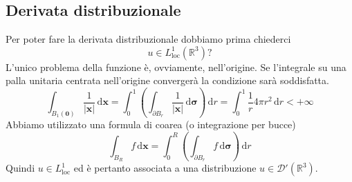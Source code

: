 \documentclass[10pt,a4paper,twoside,openright]{book}
\newcommand{\x}{\mathbf{x}}
\newcommand{\zer}{\mathbf{0}}
\newcommand{\sigg}{\bm{\sigma}}
\newcommand{\de}{\,\mathrm d}
\newcommand{\dr}{\de r}
\newcommand{\dxx}{\de \x}
\newcommand{\dsig}{\de \sigg}
\begin{document}
\subsection{Derivata distribuzionale}

Per poter fare la derivata distribuzionale dobbiamo prima chiederci
\begin{equation*}
    u\in L^{1}_{\text{loc}}\left(\mathbb{R}^{3}\right) ?
\end{equation*}
L'unico problema della funzione è, ovviamente, nell'origine. Se l'integrale su una palla unitaria centrata nell'origine convergerà la condizione sarà soddisfatta.
\begin{equation*}
    \int _{B_{1}(\zer)}\frac{1}{| \x| } \dxx =\int ^{1}_{0}\left(\int _{\partial B_{r}}\frac{1}{| \x| } \dsig \right) \dr=\int ^{1}_{0}\frac{1}{r} 4\pi r^{2} \dr< +\infty
\end{equation*}
Abbiamo utilizzato una formula di coarea (o integrazione per bucce)
\begin{equation*}
    \int _{B_{R}} f\dxx =\int ^{R}_{0}\left(\int _{\partial B_{r}} f\dsig \right) \dr
\end{equation*}
Quindi $\displaystyle u\in L_{\text{loc}}^{1}$ ed è pertanto associata a una distribuzione $\displaystyle u\in \mathcal{D} '\left(\mathbb{R}^{3}\right)$.
\end{document}
